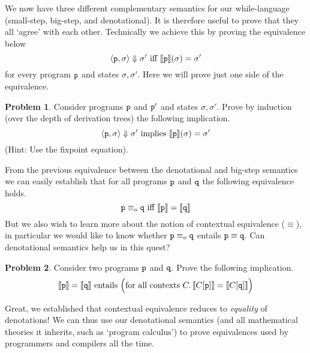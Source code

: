 \documentclass[a4paper, 11pt]{article}
\theoremstyle{definition}
\newtheorem{problem}{Problem}
\begin{document}
We now have three different complementary semantics for our while-language
(small-step, big-step, and denotational). It is therefore useful to prove that they all
`agree' with each other. Technically we achieve this by proving the equivalence below 
       \[
              \langle \mathtt{p}, \sigma \rangle \Downarrow \sigma' \text{ iff }
              \llbracket \mathtt{p} \rrbracket(\sigma) = \sigma' 
      \]
for every program $\mathtt{p}$ and states $\sigma,\sigma'$.  Here we will prove
just one side of the equivalence.
\begin{problem}
       Consider programs $\mathtt{p}$ and $\mathtt{p'}$ and states
       $\sigma,\sigma'$. Prove by induction (over the depth of
       derivation trees) the following implication.
       \[
               \langle \mathtt{p}, \sigma \rangle
               \Downarrow \sigma' \text{ implies } \llbracket \mathtt{p} \rrbracket(\sigma) = \sigma' 
       \]
       (Hint: Use the fixpoint equation).
\end{problem}

From the previous equivalence between the denotational and big-step semantics
we can easily establish that for all programs $\mathtt{p}$ and $\mathtt{q}$ the
following equivalence holds.
\[
        \mathtt{p} \equiv_o \mathtt{q} \text{ iff } \llbracket \mathtt{p} \rrbracket = \llbracket \mathtt{q} \rrbracket
\]
But we also wish to learn more about the notion of contextual equivalence
($\equiv$), in particular we would like to know whether  $\mathtt{p} \equiv_o
\mathtt{q}$ entails $\mathtt{p} \equiv \mathtt{q}$. Can denotational semantics help
us in this quest?

\begin{problem}
        Consider two programs $\mathtt{p}$ and $\mathtt{q}$. Prove the following
        implication.  
        \[
                \llbracket \mathtt{p} \rrbracket = \llbracket \mathtt{q} \rrbracket \text{ entails }
                \Big ( \text{for all contexts } C. \,
                \llbracket C[\mathtt{p}] \rrbracket = \llbracket C[\mathtt{q}] \rrbracket \Big )
        \]
\end{problem}

Great, we established that contextual equivalence reduces to \emph{equality} of
denotations! We can thus use our denotational semantics (and all mathematical
theories it inherits, such as `program calculus') to prove equivalences used by
programmers and compilers all the time.
\end{document}
